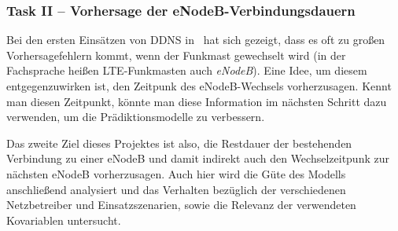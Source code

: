 \subsubsection{Task II -- Vorhersage der eNodeB-Verbindungsdauern}

Bei den ersten Eins\"atzen von DDNS in~\cite{IEEE} hat sich gezeigt, dass es oft zu gro{\ss}en Vorhersagefehlern kommt, wenn der
Funkmast gewechselt wird (in der Fachsprache hei{\ss}en LTE-Funkmasten auch \textit{eNodeB}).
Eine Idee, um diesem entgegenzuwirken ist, den Zeitpunk des eNodeB-Wechsels vorherzusagen. Kennt man diesen Zeitpunkt, k\"onnte man
diese Information im n\"achsten Schritt dazu verwenden, um die Pr\"adiktionsmodelle zu verbessern.

Das zweite Ziel dieses Projektes ist also, die Restdauer der bestehenden Verbindung zu einer eNodeB und damit indirekt auch den
Wechselzeitpunk zur n\"achsten eNodeB vorherzusagen.
Auch hier wird die G\"ute des Modells anschlie{\ss}end analysiert und das Verhalten bez\"uglich
der verschiedenen Netzbetreiber und Einsatzszenarien, sowie die Relevanz der verwendeten Kovariablen untersucht.
